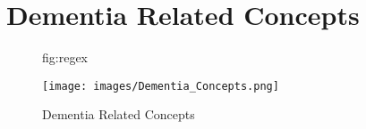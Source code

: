 \documentclass[pmlr,twocolumn]{jmlr} %
\begin{document}
  

\clearpage

\section{Dementia Related Concepts}\label{apd:app1}

\begin{figure}[htbp]
\floatconts
  {fig:regex}
  {\caption{Dementia Related Concepts}}
  {\texttt{[image: images/Dementia\_Concepts.png]}}
\end{figure}
\clearpage
\end{document}
